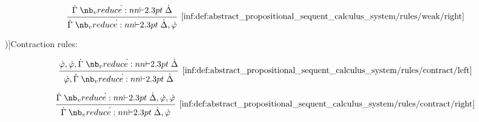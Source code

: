 \begin{definition}
\begin{thmenum}
\begin{paracol}{2}
      \begin{rightcolumn}
        \begin{equation*}\taglabel[\ensuremath{ \logic{Weak}_R }]{inf:def:abstract_propositional_sequent_calculus_system/rules/weak/right}
          \begin{prooftree}
            \hypo{ \syn\Gamma \synvdash \syn\Delta }
            \infer1[\ref{inf:def:abstract_propositional_sequent_calculus_system/rules/weak/right}]{ \syn\Gamma \synvdash \syn\Delta, \syn\varphi }
          \end{prooftree}
        \end{equation*}
      \end{rightcolumn}
    \end{paracol}

     \term[ru=правила сокращения (\cite[218]{КолмогоровДрагалин2006Логика})]{Contraction rules}:
    \begin{paracol}{2}
      \begin{leftcolumn}
        \begin{equation*}\taglabel[\ensuremath{ \logic{Contr}_L }]{inf:def:abstract_propositional_sequent_calculus_system/rules/contract/left}
          \begin{prooftree}
            \hypo{ \syn\varphi, \syn\varphi, \syn\Gamma \synvdash \syn\Delta }
            \infer1[\ref{inf:def:abstract_propositional_sequent_calculus_system/rules/contract/left}]{ \syn\varphi, \syn\Gamma \synvdash \syn\Delta }
          \end{prooftree}
        \end{equation*}
      \end{leftcolumn}

      \begin{rightcolumn}
        \begin{equation*}\taglabel[\ensuremath{ \logic{Contr}_R }]{inf:def:abstract_propositional_sequent_calculus_system/rules/contract/right}
          \begin{prooftree}
            \hypo{ \syn\Gamma \synvdash \syn\Delta, \syn\varphi, \syn\varphi }
            \infer1[\ref{inf:def:abstract_propositional_sequent_calculus_system/rules/contract/right}]{ \syn\Gamma \synvdash \syn\Delta, \syn\varphi }
          \end{prooftree}
        \end{equation*}
      \end{rightcolumn}
    \end{paracol}


\end{thmenum}
\end{definition}
